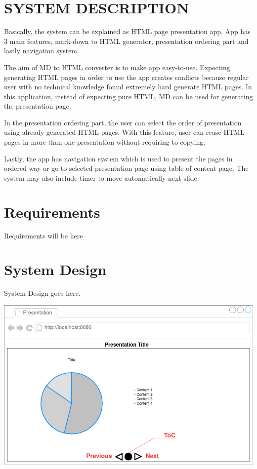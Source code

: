 \documentclass[journal,comsoc]{IEEEtran}
\begin{document}
\section{SYSTEM DESCRIPTION}

Basically, the system can be explained as HTML page presentation app. App has 3 main features, mark-down to HTML generator, presentation ordering part and lastly navigation system.

The aim of MD to HTML converter is to make app easy-to-use. Expecting generating HTML pages in order to use the app creates conflicts because regular user with no technical knowledge found extremely hard generate HTML pages. In this application, instead of expecting pure HTML, MD can be used for generating the presentation page.

In the presentation ordering part, the user can select the order of presentation using already generated HTML pages. With this feature, user can reuse HTML pages in more than one presentation without requiring to copying. 

Lastly, the app has navigation system which is used to present the pages in ordered way or go to selected presentation page using table of content page. The system may also include timer to move automatically next slide.

\section{Requirements}

Requirements will be here

\section{System Design}
System Design goes here.

\href{http://www.google.de}{\includegraphics[scale=0.33]{Mockups/NavigationSystem_1.png}} %
\end{document}
